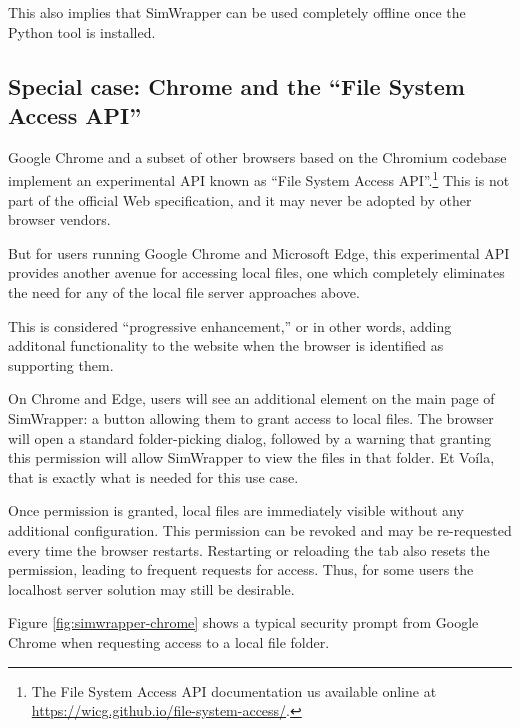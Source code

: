This also implies that SimWrapper can be used completely offline once the Python tool is installed.


\hypertarget{simwrapper-special-case-chrome-and-the-file-system-access-api}{%
\subsection{Special case: Chrome and the ``File System Access API''}
\label{simwrapper-special-case-chrome-and-the-file-system-access-api}}

Google Chrome and a subset of other browsers based on the Chromium codebase implement an experimental API known as ``File System Access API''.\footnote{The File System Access API documentation us available online at \url{https://wicg.github.io/file-system-access/}.} This is not part of the official Web specification, and it may never be adopted by other browser vendors.

But for users running Google Chrome and Microsoft Edge, this experimental API provides another avenue for accessing local files, one which completely eliminates the need for any of the local file server approaches above.

This is considered ``progressive enhancement,'' or in other words, adding additonal functionality to the website when the browser is identified as supporting them.

On Chrome and Edge, users will see an additional element on the main page of SimWrapper: a button allowing them to grant access to local files. The browser will open a standard folder-picking dialog, followed by a warning that granting this permission will allow SimWrapper to view the files in that folder. Et Voíla, that is exactly what is needed for this use case.

Once permission is granted, local files are immediately visible without any additional configuration. This permission can be revoked and may be re-requested every time the browser restarts. Restarting or reloading the tab also resets the permission, leading to frequent requests for access. Thus, for some users the localhost server solution may still be desirable.

Figure \ref{fig:simwrapper-chrome} shows a typical security prompt from Google Chrome when requesting access to a local file folder.


